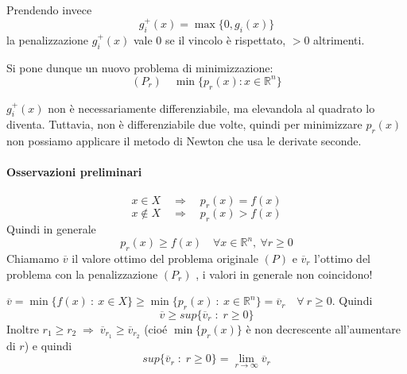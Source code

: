 Prendendo invece
$$ g_i^{+}(x) = \max\{ 0, g_i(x) \} $$
la penalizzazione $g_i^{+}(x)$ vale $0$ se il vincolo è rispettato, $>0$ altrimenti.

Si pone dunque un nuovo problema di minimizzazione:
$$(P_r) \quad \min \{ p_r(x) : x \in \mathbb{R}^{n}  \} $$

\begin{notes}
$g_i^+(x)$ non \`e necessariamente differenziabile, ma elevandola al quadrato lo diventa. Tuttavia,  non \`e differenziabile due volte, quindi per minimizzare $p_r(x)$ non possiamo applicare il metodo di Newton che usa le derivate seconde.\end{notes}


\paragraph{Osservazioni preliminari}
$$x \in X \quad \Rightarrow \quad p_r(x) = f(x) $$
$$x \notin X \quad \Rightarrow \quad p_r(x) > f(x) $$
Quindi in generale
$$ p_r(x) \geq f(x) \quad \forall x \in \mathbb{R}^{n}, ~ \forall r \geq 0$$
Chiamamo $\overline{v}$ il valore ottimo del problema originale $(P)$
e $\overline{v}_r$ l'ottimo del problema con la penalizzazione $(P_r)$ ,
i valori in generale non coincidono!

\begin{observation}
$\overline{v} = \min\{f(x) ~:~ x \in X\} \geq \min\{p_r(x) ~:~ x \in \mathbb{R}^{n} \} = \overline{v}_r \quad \forall ~ r \geq 0$. Quindi $$\overline{v} \geq
sup\{ \overline{v}_{r}\; : \; r \geq 0 \}$$
Inoltre $r_1 \geq r_2 \; \Rightarrow \; \overline{v}_{r_1}
\geq \overline{v}_{r_2}$ (cioé $\min\{p_r(x)\}$ è non decrescente all'aumentare di $r$) e quindi
$$sup\{\overline{v}_{r}\; : \;r \geq 0 \} = \lim_{r \to \infty} 
\overline{v}_r $$
\end{observation}

